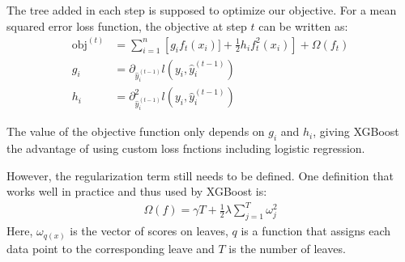 The tree added in each step is supposed to optimize our objective. For a mean squared error loss function, the objective at step $t$ can be written as:
\begin{align}
  \text{obj}^{(t)} &= \sum_{i=1}^n \left[g_i f_t(x_i)] + \frac{1}{2}h_i f_t^2(x_i)\right] + \Omega(f_t)  \\
  g_i &= \partial_{\hat{y}_i^{(t-1)}} l(y_i, \hat{y}_i^{(t-1)}) \\
  h_i &= \partial^2_{\hat{y}_i^{(t-1)}} l(y_i, \hat{y}_i^{(t-1)})
\end{align}

The value of the objective function only depends on $g_i$ and $h_i$, giving XGBoost the advantage of using custom loss fnctions including logistic regression.

However, the regularization term still needs to be defined. One definition that works well in practice and thus used by XGBoost is:
\begin{align}
  \Omega (f) = \gamma T + \frac{1}{2}\lambda \sum_{j=1}^T \omega_j^2
\end{align}
Here, $\omega_{q(x)}$ is the vector of scores on leaves, $q$ is a function that assigns each data point to the corresponding leave and $T$ is the number of leaves.
